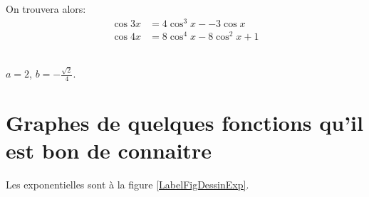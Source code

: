 \noindent On trouvera alors: \[ \begin{array} {rl}
					\cos3x&=4\cos^3x--3\cos x\\
					\cos4x&=8\cos^4x-8\cos^2x+1\end{array}\]


\\
$a=2$, $b=-\frac{\sqrt2}{4}$.


\section{Graphes de quelques fonctions qu'il est bon de connaitre}


Les exponentielles sont à la figure \ref{LabelFigDessinExp}.
\newcommand{\CaptionFigDessinExp}{Des exponentielles}


%

%

%

%

%

%

%

